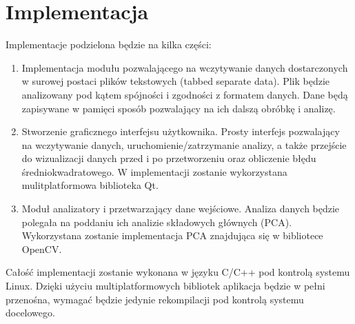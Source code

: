 \documentclass[a4paper,12pt]{article}
\begin{document}
%

\section{Implementacja}

Implementacje podzielona będzie na kilka części:

\begin{enumerate}
\item Implementacja modułu pozwalającego na wczytywanie danych dostarczonych w surowej postaci plików tekstowych (tabbed separate data). Plik będzie analizowany pod kątem spójności i zgodności z formatem danych. Dane będą zapisywane w pamięci sposób pozwalający na ich dalszą obróbkę i analizę.
\item Stworzenie graficznego interfejsu użytkownika. Prosty interfejs pozwalający na wczytywanie danych, uruchomienie/zatrzymanie analizy, a także przejście do wizualizacji danych przed i po przetworzeniu oraz obliczenie błędu średniokwadratowego. W implementacji zostanie wykorzystana mulitplatformowa biblioteka Qt.
\item Moduł analizatory i przetwarzający dane wejściowe. Analiza danych będzie polegała na poddaniu ich analizie składowych głównych (PCA). Wykorzystana zostanie implementacja PCA znajdująca się w bibliotece OpenCV.
\end{enumerate}

Całość implementacji zostanie wykonana w języku C/C++ pod kontrolą systemu Linux. Dzięki użyciu multiplatformowych bibliotek aplikacja będzie w pełni przenośna, wymagać będzie jedynie rekompilacji pod kontrolą systemu docelowego.
%
\end{document}
